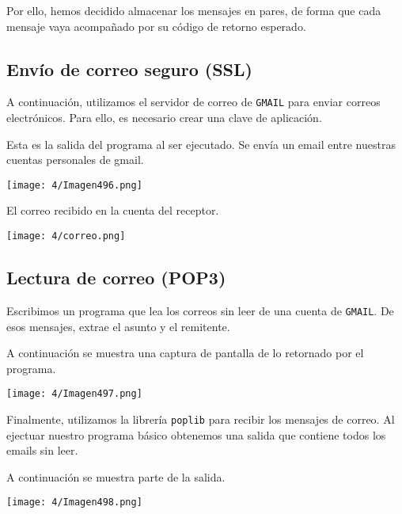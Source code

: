Por ello, hemos decidido almacenar los mensajes en pares,
de forma que cada mensaje vaya acompañado por su código de retorno esperado.

\subsection{Envío de correo seguro (SSL)}

A continuación, utilizamos el servidor de correo de \verb#GMAIL# para enviar correos electrónicos.
Para ello, es necesario crear una clave de aplicación.

Esta es la salida del programa al ser ejecutado.
Se envía un email entre nuestras cuentas personales de gmail.

\begin{minipage}{\linewidth}
	\centering
	\texttt{[image: 4/Imagen496.png]}
	\label{fig:4/14}
\end{minipage}

El correo recibido en la cuenta del receptor.

\begin{minipage}{\linewidth}
	\centering
	\texttt{[image: 4/correo.png]}
	\label{fig:4/15}
\end{minipage}

\subsection{Lectura de correo (POP3)}

Escribimos un programa que lea los correos sin leer de una cuenta de \verb#GMAIL#.
De esos mensajes, extrae el asunto y el remitente.

A continuación se muestra una captura de pantalla de lo retornado por el programa.

\begin{minipage}{\linewidth}
	\centering
	\texttt{[image: 4/Imagen497.png]}
	\label{fig:4/16}
\end{minipage}

Finalmente, utilizamos la librería \verb#poplib# para recibir los mensajes de correo.
Al ejectuar nuestro programa básico obtenemos una salida que contiene todos los emails
sin leer.

A continuación se muestra parte de la salida.

\begin{minipage}{\linewidth}
	\centering
	\texttt{[image: 4/Imagen498.png]}
	\label{fig:4/17}
\end{minipage}
